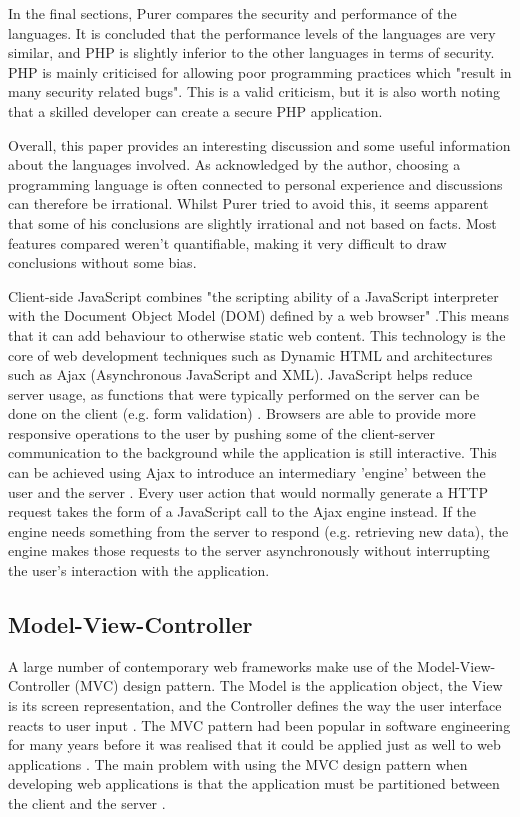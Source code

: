 \documentclass[authoryearcitations]{UoYCSproject}
\begin{document}
In the final sections, Purer compares the security and performance of the languages. It is concluded that the performance levels of the languages are very similar, and PHP is slightly inferior to the other languages in terms of security. PHP is mainly criticised for allowing poor programming practices which "result in many security related bugs". This is a valid criticism, but it is also worth noting that a skilled developer can create a secure PHP application. 

Overall, this paper provides an interesting discussion and some useful information about the languages involved. As acknowledged by the author, choosing a programming language is often connected to personal experience and discussions can therefore be irrational. Whilst Purer tried to avoid this, it seems apparent that some of his conclusions are slightly irrational and not based on facts. Most features compared weren't quantifiable, making it very difficult to draw conclusions without some bias.

Client-side JavaScript combines "the scripting ability of a JavaScript interpreter with the Document Object Model (DOM) defined by a web browser" \citep{Flanagan2006a}.This means that it can add behaviour to otherwise static web content. This technology is the core of web development techniques such as Dynamic HTML and architectures such as Ajax (Asynchronous JavaScript and XML). JavaScript helps reduce server usage, as functions that were typically performed on the server can be done on the client (e.g. form validation) \citep{Jazayeri2007}. Browsers are able to provide more responsive operations to the user by pushing some of the client-server communication to the background while the application is still interactive. This can be achieved using Ajax to introduce an intermediary 'engine' between the user and the server \citep{Garrett2005}. Every user action that would normally generate a HTTP request takes the form of a JavaScript call to the Ajax engine instead. If the engine needs something from the server to respond (e.g. retrieving new data), the engine makes those requests to the server asynchronously without interrupting the user's interaction with the application. 


\subsection{Model-View-Controller}

A large number of contemporary web frameworks make use of the Model-View-Controller (MVC) design pattern. The Model is the application object, the View is its screen representation, and the Controller defines the way the user interface reacts to user input \citep{Gamma1995}. The MVC pattern had been popular in software engineering for many years before it was realised that it could be applied just as well to web applications \citep{Jazayeri2007}.  The main problem with using the MVC design pattern when developing web applications is that the application must be partitioned between the client and the server \citep{Leff2001}.
\end{document}
